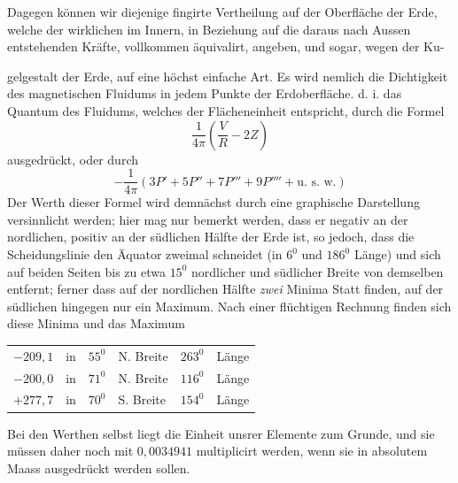 Dagegen können wir diejenige fingirte Vertheilung auf der Oberfläche der Erde, welche der wirklichen im Innern, in Beziehung auf die daraus nach Aussen entstehenden Kräfte, vollkommen äquivalirt, angeben, und sogar, wegen der Ku-
\par\clearpage
{}
\noindent gelgestalt der Erde, auf eine höchst einfache Art. Es wird nemlich die Dichtigkeit des magnetischen Fluidums in jedem Punkte der Erdoberfläche. d. i. das Quantum des Fluidums, welches der Flächeneinheit entspricht, durch die Formel
\[
\frac1{4\pi}(\frac VR-2Z)
\]
ausgedrückt, oder durch
\[
-\frac1{4\pi}(3P'+5P''+7P'''+9P''''+\text{u. s. w.})
\]
Der Werth dieser Formel wird demnächst durch eine graphische Darstellung versinnlicht werden; hier mag nur bemerkt werden, dass er negativ an der nordlichen, positiv an der südlichen Hälfte der Erde ist, so jedoch, dass die Scheidungslinie den Äquator zweimal schneidet (in $6^0$ und $186^0$ Länge) und sich auf beiden Seiten bis zu etwa $15^0$ nordlicher und südlicher Breite von demselben entfernt; ferner dass auf der nordlichen Hälfte \textit{zwei} Minima Statt finden, auf der südlichen hingegen nur ein Maximum. Nach einer flüchtigen Rechnung finden sich diese Minima und das Maximum
\begin{center}
\begin{tabular}{rlrlrl}
$-209{,}1$&in&$55^0$&N. Breite&$263^0$&Länge\\
$-200{,}0$&in&$71^0$&N. Breite&$116^0$&Länge\\
$+277{,}7$&in&$70^0$&S. Breite&$154^0$&Länge
\end{tabular}
\end{center}
Bei den Werthen selbst liegt die Einheit unsrer Elemente zum Grunde, und sie müssen daher noch mit $0{,}0034941$ multiplicirt werden, wenn sie in absolutem Maass ausgedrückt werden sollen.

